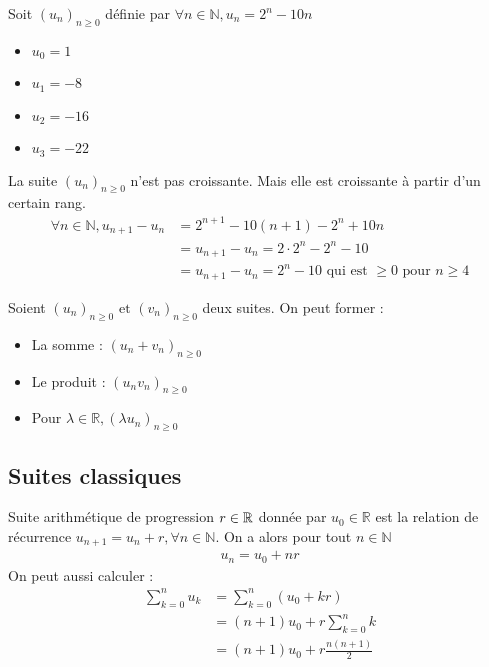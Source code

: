 \begin{exemple}
    \par Soit $(u_n)_{n \geqslant 0}$ définie par $\forall n \in \mathbb{N}, u_n = 2^n - 10n$
    \begin{itemize}
        \item $u_0 = 1$
        \item $u_1 = -8$
        \item $u_2 = -16$
        \item $u_3 = -22$
    \end{itemize}
    \par La suite $(u_n)_{n \geqslant 0}$ n'est pas croissante. Mais elle est croissante à partir d'un certain rang.
    \begin{align*}
        \forall n \in \mathbb{N}, u_{n+1} - u_n &= 2^{n+1} - 10(n+1) - 2^n + 10n \\
        &= u_{n+1} - u_n = 2 \cdot 2^n - 2^n - 10 \\
        &= u_{n + 1} - u_n = 2^n - 10 \text{ qui est } \geqslant 0 \text{ pour } n \geqslant 4
    \end{align*}
\end{exemple}

\begin{graybox}
    \begin{proposition}
    \par Soient $(u_n)_{n \geqslant 0} \text{ et } (v_n)_{n \geqslant 0}$ deux suites. On peut former :
    \begin{itemize}
        \item La somme : $(u_n + v_n)_{n \geqslant 0}$
        \item Le produit : $(u_n v_n)_{n \geqslant 0}$
        \item Pour $\lambda \in \mathbb{R}, (\lambda u_n)_{n \geqslant 0}$
    \end{itemize}
\end{proposition}
\end{graybox}

\subsection{Suites classiques}

\begin{graybox}
    \begin{proposition}
    Suite arithmétique de progression $r \in \mathbb{R}$ donnée par $u_0 \in \mathbb{R}$ est la relation de récurrence $u_{n+1} = u_n + r, \forall n \in \mathbb{N}$. On a alors pour tout $n \in \mathbb{N}$
    \begin{align*}
        u_n = u_0 + nr
    \end{align*}
    On peut aussi calculer :
    \begin{align*}
        \sum_{k = 0}^{n} u_k &= \sum_{k=0}^{n} (u_0 + kr) \\
        &= (n+1) u_0 + r\sum_{k=0}^{n}k \\
        &= (n+1)u_0 + r \frac{n(n+1)}{2}
    \end{align*}
\end{proposition}
\end{graybox}


